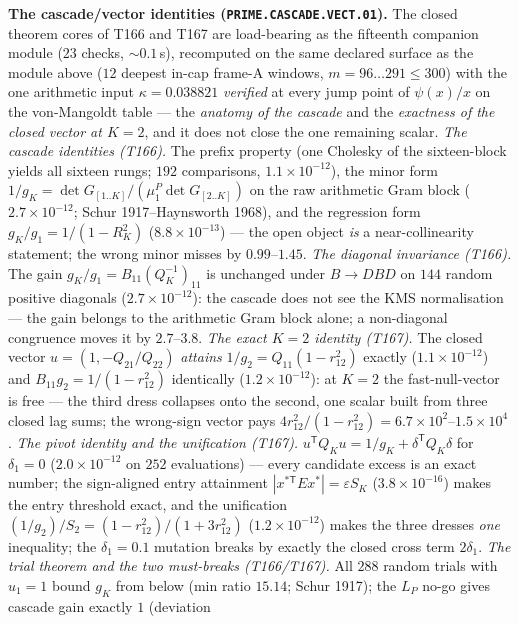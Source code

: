 \documentclass[11pt,a4paper]{article}
\theoremstyle{definition}
\begin{document}
\par\smallskip\noindent\textbf{The cascade/vector identities
(\texttt{PRIME.CASCADE.VECT.01}).}
The closed theorem cores of T166 and T167 are load-bearing as the
fifteenth companion module ($23$ checks, ${\sim}0.1$\,s), recomputed on
the same declared surface as the module above ($12$ deepest in-cap
frame-A windows, $m=96\ldots291\le300$) with the one arithmetic input
$\kappa=0.038821$ \emph{verified} at every jump point of $\psi(x)/x$ on
the von-Mangoldt table --- the \emph{anatomy of the cascade} and the
\emph{exactness of the closed vector at $K=2$}, and it does not close
the one remaining scalar.
\emph{The cascade identities (T166).} The prefix property (one Cholesky
of the sixteen-block yields all sixteen rungs; $192$ comparisons,
$1.1\times10^{-12}$), the minor form
$1/g_K=\det G_{[1..K]}/(\mu^P_1\det G_{[2..K]})$ on the raw arithmetic
Gram block ($2.7\times10^{-12}$; Schur 1917--Haynsworth 1968), and the
regression form $g_K/g_1=1/(1-R_K^2)$ ($8.8\times10^{-13}$) --- the open
object \emph{is} a near-collinearity statement; the wrong minor misses
by $0.99$--$1.45$.
\emph{The diagonal invariance (T166).} The gain
$g_K/g_1=B_{11}(Q_K^{-1})_{11}$ is unchanged under $B\to DBD$ on $144$
random positive diagonals ($2.7\times10^{-12}$): the cascade does not
see the KMS normalisation --- the gain belongs to the arithmetic Gram
block alone; a non-diagonal congruence moves it by $2.7$--$3.8$.
\emph{The exact $K=2$ identity (T167).} The closed vector
$u=(1,-Q_{21}/Q_{22})$ \emph{attains}
$1/g_2=Q_{11}(1-r_{12}^2)$ exactly ($1.1\times10^{-12}$) and
$B_{11}g_2=1/(1-r_{12}^2)$ identically ($1.2\times10^{-12}$): at $K=2$
the fast-null-vector is free --- the third dress collapses onto the
second, one scalar built from three closed lag sums; the wrong-sign
vector pays $4r_{12}^2/(1-r_{12}^2)=6.7\times10^{2}$--$1.5\times10^{4}$.
\emph{The pivot identity and the unification (T167).}
$u^{\mathsf T}Q_Ku=1/g_K+\delta^{\mathsf T}Q_K\delta$ for $\delta_1=0$
($2.0\times10^{-12}$ on $252$ evaluations) --- every candidate excess is
an exact number; the sign-aligned entry attainment
$|x^{*\mathsf T}Ex^*|=\varepsilon S_K$ ($3.8\times10^{-16}$) makes the
entry threshold exact, and the unification
$(1/g_2)/S_2=(1-r_{12}^2)/(1+3r_{12}^2)$ ($1.2\times10^{-12}$) makes the
three dresses \emph{one} inequality; the $\delta_1=0.1$ mutation breaks
by exactly the closed cross term $2\delta_1$.
\emph{The trial theorem and the two must-breaks (T166/T167).} All $288$
random trials with $u_1=1$ bound $g_K$ from below (min ratio $15.14$;
Schur 1917); the $L_P$ no-go gives cascade gain exactly $1$ (deviation
\end{document}
